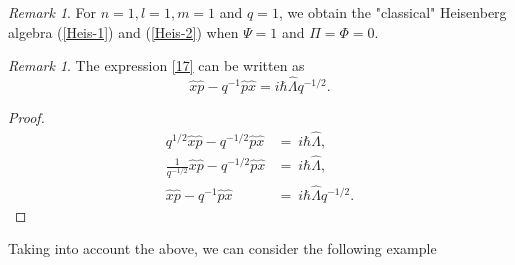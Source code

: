 \documentclass[12pt,a4paper]{article}
\theoremstyle{plain}
\theoremstyle{definition}
\theoremstyle{remark}
\newtheorem{remark}[theorem]{Remark}
\begin{document}

\begin{remark}
    For $n=1, l=1, m=1$ and $q=1$, we obtain the "classical" Heisenberg algebra (\ref{Heis-1}) and (\ref{Heis-2}) when $\Psi =1$ and $\Pi = \Phi =0$.
\end{remark}
\begin{remark}
    The expression \eqref{17} can be written as
    \begin{equation*}
        \hat{x}\hat{p}-q^{-1}\hat{p}\hat{x}=i\hbar\hat{\Lambda}q^{-1/2}.
    \end{equation*}
\end{remark}
\begin{proof}
    \begin{align*}
        q^{1/2}\hat{x}\hat{p}-q^{-1/2}\hat{p}\hat{x} & = \ i\hbar\hat{\Lambda},\\
        \frac{1}{q^{-1/2}}\hat{x}\hat{p}-q^{-1/2}\hat{p}\hat{x} & = \ i\hbar\hat{\Lambda},\\
      \hat{x}\hat{p}-q^{-1}\hat{p}\hat{x} & = \ i\hbar\hat{\Lambda}q^{-1/2}.  
    \end{align*}
\end{proof}
Taking into account the above, we can consider the following example
\end{document}
